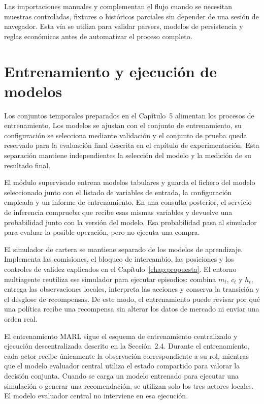 Las importaciones manuales y  complementan el flujo cuando se necesitan muestras controladas, fixtures o históricos parciales sin depender de una sesión de navegador. Esta vía se utiliza para validar parsers, modelos de persistencia y reglas económicas antes de automatizar el proceso completo.

\section{Entrenamiento y ejecución de modelos}

Los conjuntos temporales preparados en el Capítulo~5 alimentan los procesos de entrenamiento. Los modelos se ajustan con el conjunto de entrenamiento, su configuración se selecciona mediante validación y el conjunto de prueba queda reservado para la evaluación final descrita en el capítulo de experimentación. Esta separación mantiene independientes la selección del modelo y la medición de su resultado final.

El módulo supervisado entrena modelos tabulares y guarda el fichero del modelo seleccionado junto con el listado de variables de entrada, la configuración empleada y un informe de entrenamiento. En una consulta posterior, el servicio de inferencia comprueba que recibe esas mismas variables y devuelve una probabilidad junto con la versión del modelo. Esa probabilidad pasa al simulador para evaluar la posible operación, pero no ejecuta una compra.

El simulador de cartera se mantiene separado de los modelos de aprendizaje. Implementa las comisiones, el bloqueo de intercambio, las posiciones y los controles de validez explicados en el Capítulo~\ref{chap:propuesta}. El entorno multiagente reutiliza ese simulador para ejecutar episodios: combina $m_t$, $c_t$ y $h_t$, entrega las observaciones locales, interpreta las acciones y conserva la transición y el desglose de recompensas. De este modo, el entrenamiento puede revisar por qué una política recibe una recompensa sin alterar los datos de mercado ni enviar una orden real.

El entrenamiento MARL sigue el esquema de entrenamiento centralizado y ejecución descentralizada descrito en la Sección~2.4. Durante el entrenamiento, cada actor recibe únicamente la observación correspondiente a su rol, mientras que el modelo evaluador central utiliza el estado compartido para valorar la decisión conjunta. Cuando se carga un modelo entrenado para ejecutar una simulación o generar una recomendación, se utilizan solo los tres actores locales. El modelo evaluador central no interviene en esa ejecución.

